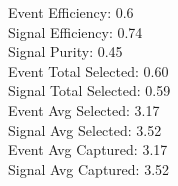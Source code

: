 Event  Efficiency:     0.6\\
Signal Efficiency:     0.74\\
Signal Purity:         0.45\\
Event  Total Selected: 0.60\\
Signal Total Selected: 0.59\\
Event  Avg Selected:   3.17\\
Signal Avg Selected:   3.52\\
Event  Avg Captured:   3.17\\
Signal Avg Captured:   3.52